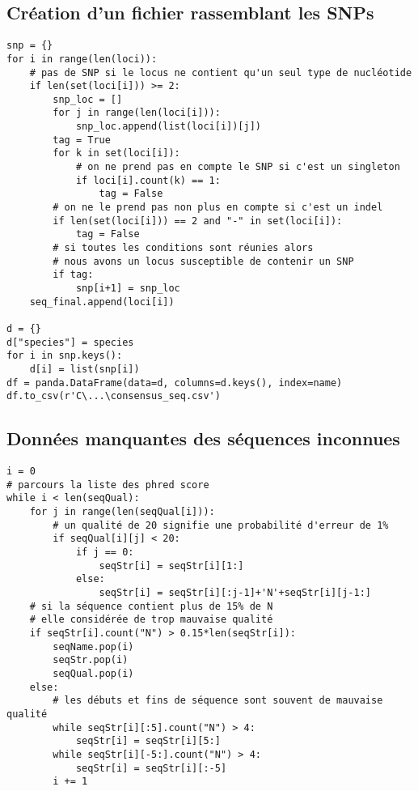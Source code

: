 \subsection{Création d'un fichier rassemblant les SNPs}
\label{ann:annexeD2}
    \begin{tcolorbox}[colback=darkgray!5!white,colframe=black!75!black]
        \begin{verbatim}
snp = {}
for i in range(len(loci)):
    # pas de SNP si le locus ne contient qu'un seul type de nucléotide
    if len(set(loci[i])) >= 2:
        snp_loc = []
        for j in range(len(loci[i])):
            snp_loc.append(list(loci[i])[j])
        tag = True
        for k in set(loci[i]):
            # on ne prend pas en compte le SNP si c'est un singleton
            if loci[i].count(k) == 1:
                tag = False
        # on ne le prend pas non plus en compte si c'est un indel
        if len(set(loci[i])) == 2 and "-" in set(loci[i]):
            tag = False
        # si toutes les conditions sont réunies alors
        # nous avons un locus susceptible de contenir un SNP
        if tag:
            snp[i+1] = snp_loc
    seq_final.append(loci[i])

d = {}
d["species"] = species
for i in snp.keys():
    d[i] = list(snp[i])
df = panda.DataFrame(data=d, columns=d.keys(), index=name)
df.to_csv(r'C\...\consensus_seq.csv')
        \end{verbatim}
    \end{tcolorbox}
\subsection{Données manquantes des séquences inconnues}
\label{ann:annexeD3}
    \begin{tcolorbox}
        \begin{verbatim}
i = 0
# parcours la liste des phred score
while i < len(seqQual):
    for j in range(len(seqQual[i])):
        # un qualité de 20 signifie une probabilité d'erreur de 1%
        if seqQual[i][j] < 20:
            if j == 0:
                seqStr[i] = seqStr[i][1:]
            else:
                seqStr[i] = seqStr[i][:j-1]+'N'+seqStr[i][j-1:]
    # si la séquence contient plus de 15% de N
    # elle considérée de trop mauvaise qualité
    if seqStr[i].count("N") > 0.15*len(seqStr[i]):
        seqName.pop(i)
        seqStr.pop(i)
        seqQual.pop(i)
    else:
        # les débuts et fins de séquence sont souvent de mauvaise qualité
        while seqStr[i][:5].count("N") > 4:
            seqStr[i] = seqStr[i][5:]
        while seqStr[i][-5:].count("N") > 4:
            seqStr[i] = seqStr[i][:-5]
        i += 1
        \end{verbatim}
    \end{tcolorbox}

